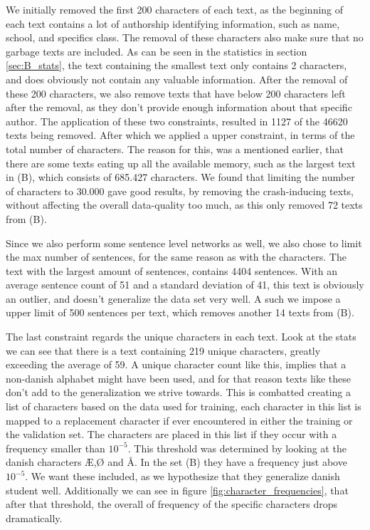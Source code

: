 We initially removed the first 200 characters of each text, as the beginning
of each text contains a lot of authorship identifying information, such as
name, school, and specifics class. The removal of these characters also make
sure that no garbage texts are included. As can be seen in the statistics in
section \ref{sec:B_stats}, the text containing the smallest text only contains
2 characters, and does obviously not contain any valuable information. After
the removal of these 200 characters, we also remove texts that have below 200
characters left after the removal, as they don't provide enough information
about that specific author. The application of these two constraints, resulted
in 1127 of the 46620 texts being removed. After which we applied a upper
constraint, in terms of the total number of characters. The reason for this,
was a mentioned earlier, that there are some texts eating up all the available
memory, such as the largest text in (B), which consists of 685.427 characters.
We found that limiting the number of characters to 30.000 gave good results, by
removing the crash-inducing texts, without affecting the overall data-quality
too much, as this only removed 72 texts from (B).

Since we also perform some sentence level networks as well, we also chose to
limit the max number of sentences, for the same reason as with the characters.
The text with the largest amount of sentences, contains 4404 sentences. With
an average sentence count of 51 and a standard deviation of 41, this text is
obviously an outlier, and doesn't generalize the data set very well. A such we
impose a upper limit of 500 sentences per text, which removes another 14 texts
from (B).

The last constraint regards the unique characters in each text. Look at the
stats we can see that there is a text containing 219 unique characters, greatly
exceeding the average of 59. A unique character count like this, implies that a
non-danish alphabet might have been used, and for that reason texts like these
don't add to the generalization we strive towards. This is combatted creating a
list of characters based on the data used for training, each character in this
list is mapped to a replacement character if ever encountered in either the
training or the validation set. The characters are placed in this list if they
occur with a frequency smaller than $10^{-5}$. This threshold was determined
by looking at the danish characters Æ,Ø and Å. In the set (B) they have
a frequency just above $10^{-5}$. We want these included, as we hypothesize
that they generalize danish student well. Additionally we can see in figure
\ref{fig:character_frequencies}, that after that threshold, the overall of
frequency of the specific characters drops dramatically.

